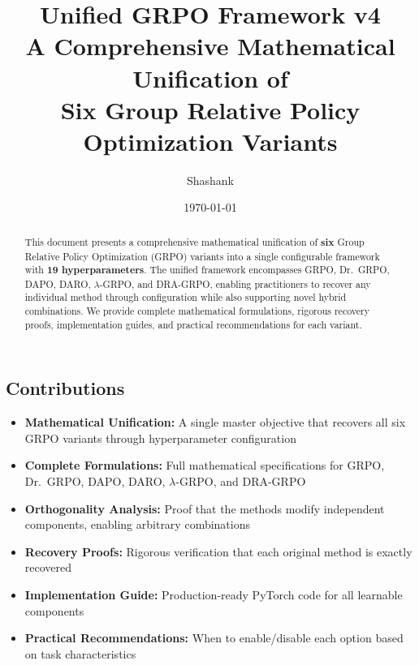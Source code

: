 \documentclass[11pt,a4paper]{article}
\title{\textbf{Unified GRPO Framework v4}\\[0.3em]
\Large A Comprehensive Mathematical Unification of\\Six Group Relative Policy Optimization Variants}
\author{Shashank}
\date{\today}
\begin{document}
\maketitle

\begin{abstract}
This document presents a comprehensive mathematical unification of \textbf{six} Group Relative Policy Optimization (GRPO) variants into a single configurable framework with \textbf{19 hyperparameters}. The unified framework encompasses GRPO, Dr.~GRPO, DAPO, DARO, $\lambda$-GRPO, and DRA-GRPO, enabling practitioners to recover any individual method through configuration while also supporting novel hybrid combinations. We provide complete mathematical formulations, rigorous recovery proofs, implementation guides, and practical recommendations for each variant.
\end{abstract}

\subsection*{Contributions}

\begin{itemize}[leftmargin=*]
    \item \textbf{Mathematical Unification:} A single master objective that recovers all six GRPO variants through hyperparameter configuration
    \item \textbf{Complete Formulations:} Full mathematical specifications for GRPO, Dr.~GRPO, DAPO, DARO, $\lambda$-GRPO, and DRA-GRPO
    \item \textbf{Orthogonality Analysis:} Proof that the methods modify independent components, enabling arbitrary combinations
    \item \textbf{Recovery Proofs:} Rigorous verification that each original method is exactly recovered
    \item \textbf{Implementation Guide:} Production-ready PyTorch code for all learnable components
    \item \textbf{Practical Recommendations:} When to enable/disable each option based on task characteristics
\end{itemize}
\end{document}
